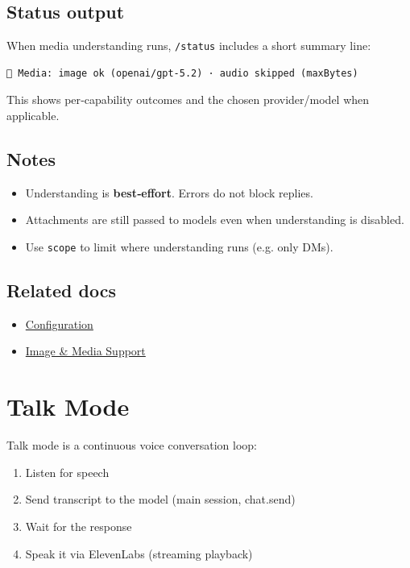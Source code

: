 \subsection{Status output}


When media understanding runs, \texttt{/status} includes a short summary line:

\begin{lstlisting}
📎 Media: image ok (openai/gpt-5.2) · audio skipped (maxBytes)
\end{lstlisting}


This shows per‑capability outcomes and the chosen provider/model when applicable.

\subsection{Notes}


\begin{itemize}
  \item Understanding is \textbf{best‑effort}. Errors do not block replies.
  \item Attachments are still passed to models even when understanding is disabled.
  \item Use \texttt{scope} to limit where understanding runs (e.g. only DMs).
\end{itemize}


\subsection{Related docs}


\begin{itemize}
  \item \href{/gateway/configuration}{Configuration}
  \item \href{/nodes/images}{Image \& Media Support}
\end{itemize}



\clearpage

\section{Talk Mode}


Talk mode is a continuous voice conversation loop:

\begin{enumerate}
  \item Listen for speech
  \item Send transcript to the model (main session, chat.send)
  \item Wait for the response
  \item Speak it via ElevenLabs (streaming playback)
\end{enumerate}


